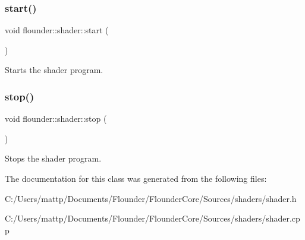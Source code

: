 \subsubsection{\texorpdfstring{start()}{start()}}
{\footnotesize\ttfamily void flounder\+::shader\+::start (\begin{DoxyParamCaption}{ }\end{DoxyParamCaption})}



Starts the shader program. 

\mbox{\label{classflounder_1_1shader_a2972bda7e96b86de9a12a44e3e285691}} 
\subsubsection{\texorpdfstring{stop()}{stop()}}
{\footnotesize\ttfamily void flounder\+::shader\+::stop (\begin{DoxyParamCaption}{ }\end{DoxyParamCaption})}



Stops the shader program. 



The documentation for this class was generated from the following files\+:\begin{DoxyCompactItemize}
\item 
C\+:/\+Users/mattp/\+Documents/\+Flounder/\+Flounder\+Core/\+Sources/shaders/shader.\+h\item 
C\+:/\+Users/mattp/\+Documents/\+Flounder/\+Flounder\+Core/\+Sources/shaders/shader.\+cpp\end{DoxyCompactItemize}
